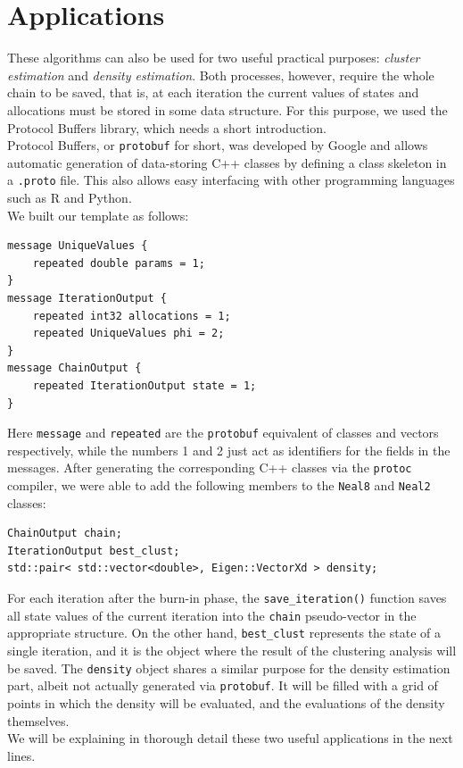 \chapter{Applications}
These algorithms can also be used for two useful practical purposes: \emph{cluster estimation} and \emph{density estimation}.
Both processes, however, require the whole chain to be saved, that is, at each iteration the current values of states and allocations must be stored in some data structure.
For this purpose, we used the Protocol Buffers library, which needs a short introduction. \\
Protocol Buffers, or \verb|protobuf| for short, was developed by Google and allows automatic generation of data-storing C++ classes by defining a class skeleton in a \verb|.proto| file.
This also allows easy interfacing with other programming languages such as R and Python. \\
We built our template as follows:
\begin{verbatim}
message UniqueValues {
    repeated double params = 1;
}
message IterationOutput {
    repeated int32 allocations = 1;
    repeated UniqueValues phi = 2;
}
message ChainOutput {
    repeated IterationOutput state = 1;
}
\end{verbatim}
Here \verb|message| and \verb|repeated| are the \verb|protobuf| equivalent of classes and vectors respectively, while the numbers 1 and 2 just act as identifiers for the fields in the messages.
After generating the corresponding C++ classes via the \verb|protoc| compiler, we were able to add the following members to the \verb|Neal8| and \verb|Neal2| classes:
\begin{verbatim}
ChainOutput chain;
IterationOutput best_clust;
std::pair< std::vector<double>, Eigen::VectorXd > density;
\end{verbatim}
For each iteration after the burn-in phase, the \verb|save_iteration()| function saves all state values of the current iteration into the \verb|chain| pseudo-vector in the appropriate structure.
On the other hand, \verb|best_clust| represents the state of a single iteration, and it is the object where the result of the clustering analysis will be saved.
The \verb|density| object shares a similar purpose for the density estimation part, albeit not actually generated via \verb|protobuf|.
It will be filled with a grid of points in which the density will be evaluated, and the evaluations of the density themselves. \\
We will be explaining in thorough detail these two useful applications in the next lines.

